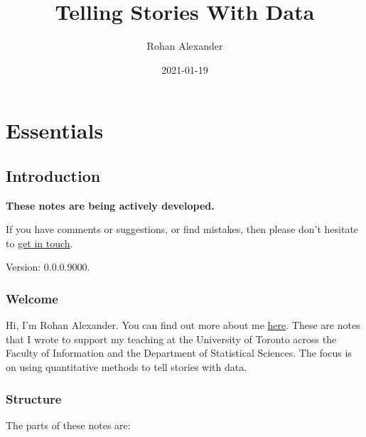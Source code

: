 \documentclass[
]{book}
\title{Telling Stories With Data}
\author{Rohan Alexander}
\date{2021-01-19}
\begin{document}
\maketitle

{
\setcounter{tocdepth}{1}
\tableofcontents
}
\hypertarget{part-essentials}{%
\part{Essentials}\label{part-essentials}}

\hypertarget{introduction}{%
\chapter{Introduction}\label{introduction}}

\textbf{These notes are being actively developed.}

If you have comments or suggestions, or find mistakes, then please don't hesitate to \href{mailto:rohan.alexander@utoronto.ca}{get in touch}.

Version: 0.0.0.9000.

\hypertarget{welcome}{%
\section{Welcome}\label{welcome}}

Hi, I'm Rohan Alexander. You can find out more about me \href{https://rohanalexander.com/}{here}. These are notes that I wrote to support my teaching at the University of Toronto across the Faculty of Information and the Department of Statistical Sciences. The focus is on using quantitative methods to tell stories with data.

\hypertarget{structure}{%
\section{Structure}\label{structure}}

The parts of these notes are:
\end{document}
